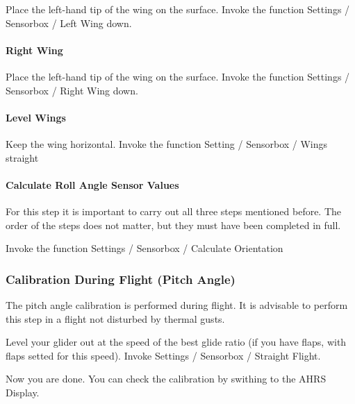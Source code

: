Place the left-hand tip of the wing on the surface. Invoke the function Settings / Sensorbox / Left
Wing down.	


\paragraph{Right Wing}

Place the left-hand tip of the wing on the surface. Invoke the function Settings / Sensorbox / Right
Wing down.


\paragraph{Level Wings}

Keep the wing horizontal. Invoke the function Setting / Sensorbox / Wings straight


\paragraph{Calculate Roll Angle Sensor Values}

For this step it is important to carry out all three steps mentioned before. The order of the steps does
not matter, but they must have been completed in full.

Invoke the function Settings / Sensorbox / Calculate Orientation


\subsubsection{Calibration During Flight (Pitch Angle)}

The pitch angle calibration is performed during flight. It is advisable to perform this step in a flight
not disturbed by thermal gusts.

Level your glider out at the speed of the best glide ratio (if you have flaps, with flaps setted for this
speed). Invoke Settings / Sensorbox / Straight Flight.

Now you are done. You can check the calibration by swithing to the AHRS Display.
